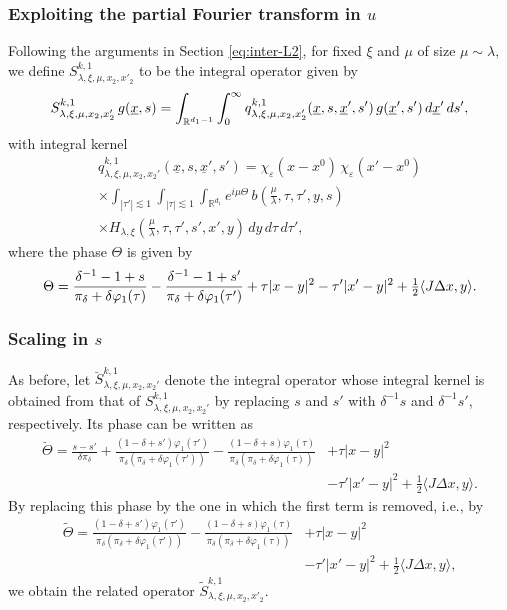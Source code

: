 \documentclass[leqno]{amsart}
\theoremstyle{definition}
\theoremstyle{remark}
\numberwithin{equation}{section}
\newcommand{\R}{\mathbb{R}}
\newcommand\la{{\lambda}}
\begin{document}
\subsubsection{ Exploiting the partial Fourier transform in $u$}
Following the arguments in Section \ref{eq:inter-L2}, for fixed $\xi$ and $\mu$ of size $\mu\sim \la,$ we define $S_{\lambda,\xi,\mu,x_2,x'_2}^{k,1}$   to be the integral operator  given by
\[
S_{\lambda,\xi,\mu,x_2,x'_2}^{k,1} \, g(\underline x,s) \\
 = \int_{\R^{d_1-1}} \int_0^\infty q^{k,1}_{\lambda,\xi,\mu,x_2,x'_2}(\underline x,s,\underline x',s') \, g(\underline x',s') \, d\underline x' \, ds',
\]
with integral kernel
\begin{multline*}
q^{k,1}_{\lambda,\xi,\mu,x_2,x_2'}
(\underline x,s,\underline x',s')
=\chi_\varepsilon(x-x^0)\,\chi_\varepsilon(x'-x^0)\\
\times\int_{|\tau'|\lesssim 1}\int_{|\tau|\lesssim 1}\int_{\R^{d_1}}
 e^{i\mu\Theta}\,
 b(\tfrac\mu\la,\tau,\tau',y,s)\\
\times H_{\la,\xi}(\tfrac\mu\la,\tau,\tau',s',x',y)\,
 dy\,d\tau\,d\tau',
\end{multline*}
where the phase $\Theta$ is given by
\[
\Theta
 = \frac{\delta^{-1}-1 + s}{\pi_\delta + \delta \varphi_1(\tau)}
 - \frac{\delta^{-1}-1 + s'}{\pi_\delta + \delta \varphi_1(\tau')} +\tau| x-y|^2 -  \tau'| x'-y|^2 \notag \\
 + \tfrac 1 2 \langle J \Delta x,y\rangle. 
\]

\subsubsection{Scaling in $s$}

As before, let $\breve S_{\lambda,\xi,\mu,x_2,x_2'}^{k,1}$ denote the integral operator whose integral kernel is obtained from that of
$S_{\lambda,\xi,\mu,x_2,x_2'}^{k,1}$ by replacing $s$ and $s'$ with
$\delta^{-1}s$ and $\delta^{-1}s'$, respectively. Its phase can be written as
\begin{align*}
\breve\Theta
=\frac{s-s'}{\delta\pi_\delta}
+\frac{(1-\delta+s')\varphi_1(\tau')}
{\pi_\delta(\pi_\delta+\delta\varphi_1(\tau'))}
-\frac{(1-\delta+s)\varphi_1(\tau)}
{\pi_\delta(\pi_\delta+\delta\varphi_1(\tau))}
& +\tau|x-y|^2\\
& -\tau'|x'-y|^2 
+\tfrac12\langle J\Delta x,y\rangle.
\end{align*}
By replacing  this phase by the one in which the first term is removed, i.e., by
\begin{align*}
\tilde\Theta
=\frac{(1-\delta+s')\varphi_1(\tau')}
{\pi_\delta(\pi_\delta+\delta\varphi_1(\tau'))}
-\frac{(1-\delta+s)\varphi_1(\tau)}
{\pi_\delta(\pi_\delta+\delta\varphi_1(\tau))}
& + \tau|x-y|^2 \\ 
& - \tau'|x'-y|^2
+\tfrac12\langle J\Delta x,y\rangle,
\end{align*}
we obtain the related operator $\tilde S_{\lambda,\xi,\mu,x_2,x'_2}^{k,1}.$ 
\end{document}
